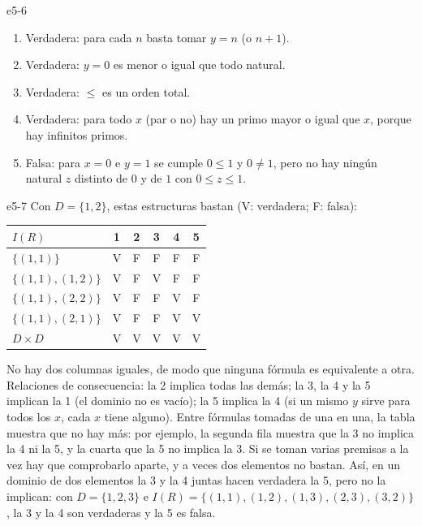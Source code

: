 \begin{solucion}{e5-6}
\begin{enumerate}
    \item Verdadera: para cada $n$ basta tomar $y = n$ (o $n + 1$).
    \item Verdadera: $y = 0$ es menor o igual que todo natural.
    \item Verdadera: $\le$ es un orden total.
    \item Verdadera: para todo $x$ (par o no) hay un primo mayor o igual que $x$, porque hay infinitos primos.
    \item Falsa: para $x = 0$ e $y = 1$ se cumple $0 \le 1$ y $0 \neq 1$, pero no hay ningún natural $z$ distinto de $0$ y de $1$ con $0 \le z \le 1$.
\end{enumerate}
\end{solucion}

\begin{solucion}{e5-7}
Con $D = \{1, 2\}$, estas estructuras bastan (V: verdadera; F: falsa):
\begin{center}
\begin{tabular}{l|ccccc}
$I(R)$ & 1 & 2 & 3 & 4 & 5 \\
\hline
$\{(1, 1)\}$ & V & F & F & F & F \\
$\{(1, 1), (1, 2)\}$ & V & F & V & F & F \\
$\{(1, 1), (2, 2)\}$ & V & F & F & V & F \\
$\{(1, 1), (2, 1)\}$ & V & F & F & V & V \\
$D \times D$ & V & V & V & V & V
\end{tabular}
\end{center}
No hay dos columnas iguales, de modo que ninguna fórmula es equivalente a otra. Relaciones de consecuencia: la 2 implica todas las demás; la 3, la 4 y la 5 implican la 1 (el dominio no es vacío); la 5 implica la 4 (si un mismo $y$ sirve para todos los $x$, cada $x$ tiene alguno). Entre fórmulas tomadas de una en una, la tabla muestra que no hay más: por ejemplo, la segunda fila muestra que la 3 no implica la 4 ni la 5, y la cuarta que la 5 no implica la 3. Si se toman varias premisas a la vez hay que comprobarlo aparte, y a veces dos elementos no bastan. Así, en un dominio de dos elementos la 3 y la 4 juntas hacen verdadera la 5, pero no la implican: con $D = \{1, 2, 3\}$ e $I(R) = \{(1, 1), (1, 2), (1, 3), (2, 3), (3, 2)\}$, la 3 y la 4 son verdaderas y la 5 es falsa.
\end{solucion}

